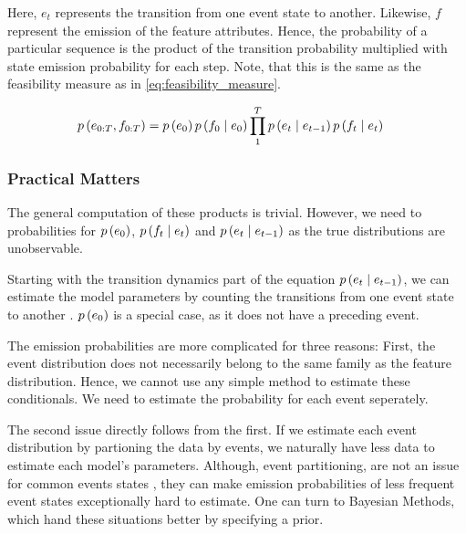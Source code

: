 \documentclass[./../../paper.tex]{subfiles}
\begin{document}

% 


\noindent Here, $e_t$ represents the transition from one event state to another. Likewise, $f$ represent the emission of the feature attributes.  Hence, the probability of a particular sequence is the product of the transition probability multiplied with state emission probability for each step. Note, that this is the same as the feasibility measure as in \autoref{eq:feasibility_measure}. 

\begin{align}
    p\left(e_{0:T},f_{0:T}\right) & = p\left(e_0\right)p\left(f_0 \mid e_0\right)\prod_1^T p\left(e_t \mid e_{t-1}\right) p\left(f_t \mid e_t\right)  
\end{align}


\subsubsection{Practical Matters}
The general computation of these products is trivial. However, we need to probabilities for $p\left(e_0\right)$, $p\left(f_t \mid e_t\right)$ and $p\left(e_t \mid e_{t-1}\right)$ as the true distributions are unobservable. 

Starting with the transition dynamics part of the equation $p\left(e_t \mid e_{t-1}\right)$, we can estimate the model parameters by counting the transitions from one event state  to another . $p\left(e_0\right)$ is a special case, as it does not have a preceding event. 

The emission probabilities are more complicated for three reasons: First, the event distribution does not necessarily belong to the same family as the feature distribution. Hence, we cannot use any simple method to estimate these conditionals. We need to estimate the probability for each event seperately.  

The second issue directly follows from the first. If we estimate each event distribution by partioning the data by events, we naturally have less data to estimate each model's parameters. Although, event partitioning, are not an issue for common events states , they can make emission probabilities of less frequent event states exceptionally hard to estimate. 
One can turn to Bayesian Methods, which hand these situations better by specifying a prior.   
\end{document}
